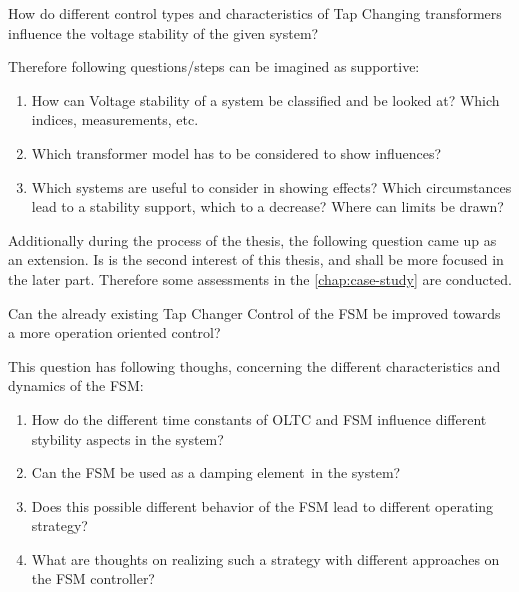 \begin{tcolorbox}[float, colback=ees_blue!5!white,colframe=ees_blue, toptitle=1mm, bottomtitle=1mm, left=2mm, right=2.5mm, top=2mm, bottom=2mm, title={\textbf{Research Question of this Thesis}}]
    How do different control types and characteristics of Tap Changing transformers influence the voltage stability of the given system?
\end{tcolorbox}

Therefore following questions/steps can be imagined as supportive:
\begin{enumerate}
    \item How can Voltage stability of a system be classified and be looked at? Which indices, measurements, etc.
    \item Which transformer model has to be considered to show influences?
    \item Which systems are useful to consider in showing effects? Which circumstances lead to a stability support, which to a decrease? Where can limits be drawn?
\end{enumerate}

Additionally during the process of the thesis, the following question came up as an extension.
Is is the second interest of this thesis, and shall be more focused in the later part.
Therefore some assessments in the \autoref{chap:case-study} are conducted.

\begin{tcolorbox}[float, colback=ees_green!5!white,colframe=ees_green, toptitle=1mm, bottomtitle=1mm, left=2mm, right=2.5mm, top=2mm, bottom=2mm, title={\textbf{Additional Question of this Thesis}}]
    Can the already existing Tap Changer Control of the \acf{FSM} be improved towards a more operation oriented control?
\end{tcolorbox}

This question has following thoughs, concerning the different characteristics and dynamics of the \acs{FSM}:
\begin{enumerate}
    \item How do the different time constants of \acs{OLTC} and \acs{FSM} influence different stybility aspects in the system?
    \item Can the \acs{FSM} be used as a \glqq damping element\grqq~in the system?
    \item Does this possible different behavior of the \acs{FSM} lead to different operating strategy?
    \item What are thoughts on realizing such a strategy with different approaches on the \acs{FSM} controller?
\end{enumerate}

